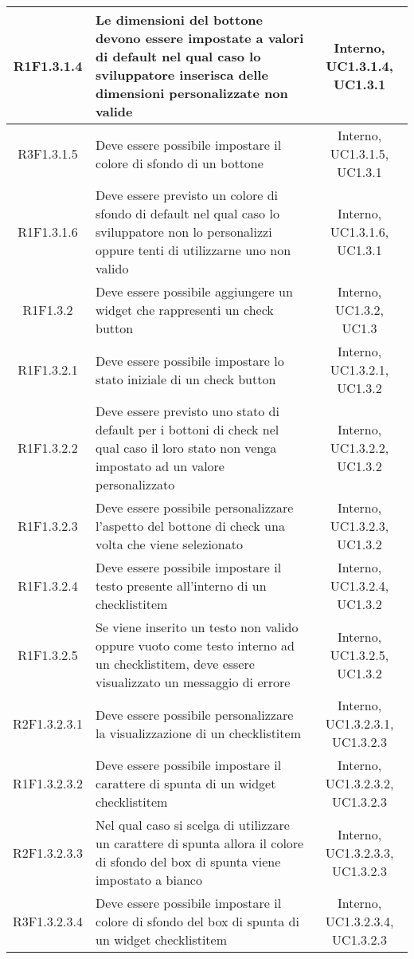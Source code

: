 \begin{longtable}{|c|>{\centering}m{7cm}|c|}
			\hline
			R1F1.3.1.4 & Le dimensioni del bottone devono essere impostate a valori di default nel qual caso lo sviluppatore inserisca delle dimensioni personalizzate non valide & Interno, UC1.3.1.4, UC1.3.1 \\
			\hline
			R3F1.3.1.5 & Deve essere possibile impostare il colore di sfondo di un bottone & Interno, UC1.3.1.5, UC1.3.1 \\
			\hline
			R1F1.3.1.6 & Deve essere previsto un colore di sfondo di default nel qual caso lo sviluppatore non lo personalizzi oppure tenti di utilizzarne uno non valido & Interno, UC1.3.1.6, UC1.3.1 \\
			\hline
			R1F1.3.2 & Deve essere possibile aggiungere un widget che rappresenti un check button & Interno, UC1.3.2, UC1.3 \\
			\hline
			R1F1.3.2.1 & Deve essere possibile impostare lo stato iniziale di un check button & Interno, UC1.3.2.1, UC1.3.2 \\
		\hline
		R1F1.3.2.2 & Deve essere previsto uno stato di default per i bottoni di check nel qual caso il loro stato non venga impostato ad un valore personalizzato & Interno, UC1.3.2.2, UC1.3.2 \\
		\hline
		R1F1.3.2.3 & Deve essere possibile personalizzare l'aspetto del bottone di check una volta che viene selezionato & Interno, UC1.3.2.3, UC1.3.2 \\
		\hline
		R1F1.3.2.4 & Deve essere possibile impostare il testo presente all'interno di un checklistitem & Interno, UC1.3.2.4, UC1.3.2 \\
		\hline
		R1F1.3.2.5 & Se viene inserito un testo non valido oppure vuoto come testo interno ad un checklistitem, deve essere visualizzato un messaggio di errore & Interno, UC1.3.2.5, UC1.3.2 \\
		\hline
		R2F1.3.2.3.1 & Deve essere possibile personalizzare la visualizzazione di un checklistitem & Interno, UC1.3.2.3.1, UC1.3.2.3 \\ 
		\hline
		R1F1.3.2.3.2 & Deve essere possibile impostare il carattere di spunta di un widget checklistitem & Interno, UC1.3.2.3.2, UC1.3.2.3 \\ 
		\hline
		R2F1.3.2.3.3 & Nel qual caso si scelga di utilizzare un carattere di spunta allora il colore di sfondo del box di spunta viene impostato a bianco & Interno, UC1.3.2.3.3, UC1.3.2.3 \\ 
		\hline
		R3F1.3.2.3.4 & Deve essere possibile impostare il colore di sfondo del box di spunta di un widget checklistitem & Interno, UC1.3.2.3.4, UC1.3.2.3 \\ 

\end{longtable}
